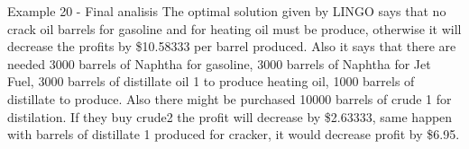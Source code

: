 \begin{frame}{Example 20 - Final analisis}
The optimal solution given by LINGO says that no crack oil barrels for gasoline
and for heating oil must be produce, otherwise it will decrease the profits by
\$10.58333 per barrel produced. Also it says that there are needed 3000 barrels of
Naphtha for gasoline, 3000 barrels of Naphtha for Jet Fuel, 3000 barrels of distillate
oil 1 to produce heating oil, 1000 barrels of distillate to produce. Also there might be
purchased 10000 barrels of crude 1 for distilation. If they buy crude2 the profit will
decrease by \$2.63333, same happen with barrels of distillate 1 produced for cracker,
it would decrease profit by \$6.95.

\end{frame}
